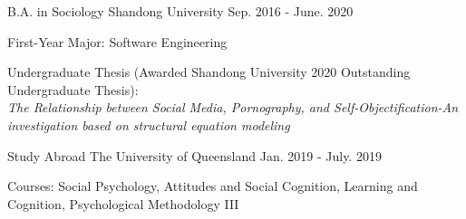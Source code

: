 \begin{cventries}
   \cventry
    {B.A. in Sociology} %
    {Shandong University} %
    {Sep. 2016 - June. 2020} %
    {} %
    {
      \begin{cvitems} %
        \item {First-Year Major: Software Engineering}
        \item {Undergraduate Thesis (Awarded Shandong University 2020 Outstanding Undergraduate Thesis): \\ \textit{The Relationship between Social Media, Pornography, and Self-Objectification-An investigation based on structural equation modeling}}
      \end{cvitems}
    }
    
   \cventry
    {Study Abroad} %
    {The University of Queensland} %
    {Jan. 2019 - July. 2019} %
    {} %
    {
      \begin{cvitems} %
        \item {Courses: Social Psychology, Attitudes and Social Cognition, Learning and Cognition, Psychological Methodology III}
     \end{cvitems}
    }

\end{cventries}
